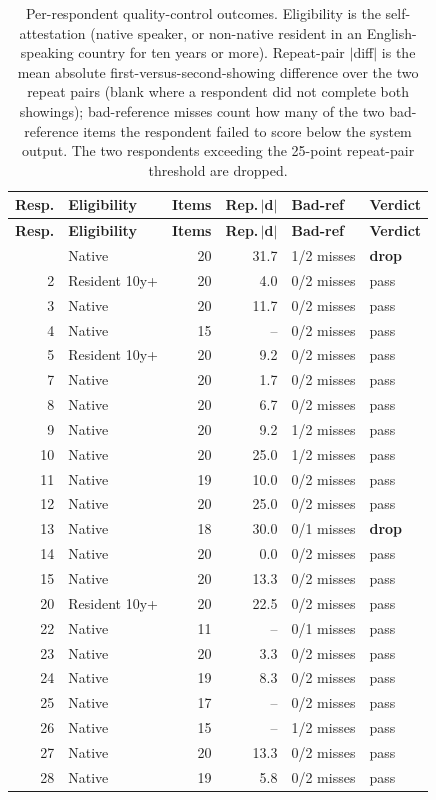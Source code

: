 \begin{longtable}{rlrrll}
\caption{Per-respondent quality-control outcomes. Eligibility is the self-attestation (native speaker, or non-native resident in an English-speaking country for ten years or more). Repeat-pair $|$diff$|$ is the mean absolute first-versus-second-showing difference over the two repeat pairs (blank where a respondent did not complete both showings); bad-reference misses count how many of the two bad-reference items the respondent failed to score below the system output. The two respondents exceeding the 25-point repeat-pair threshold are dropped.}\label{tab:appendix-qc}\\
\hline
\textbf{Resp.} & \textbf{Eligibility} & \textbf{Items} & \textbf{Rep.\,$|$d$|$} & \textbf{Bad-ref} & \textbf{Verdict} \\
\hline
\endfirsthead
\hline
\textbf{Resp.} & \textbf{Eligibility} & \textbf{Items} & \textbf{Rep.\,$|$d$|$} & \textbf{Bad-ref} & \textbf{Verdict} \\
\hline
\endhead
\hline
\endfoot
1 & Native & 20 & 31.7 & 1/2 misses & \textbf{drop} \\
2 & Resident 10y+ & 20 & 4.0 & 0/2 misses & pass \\
3 & Native & 20 & 11.7 & 0/2 misses & pass \\
4 & Native & 15 & -- & 0/2 misses & pass \\
5 & Resident 10y+ & 20 & 9.2 & 0/2 misses & pass \\
7 & Native & 20 & 1.7 & 0/2 misses & pass \\
8 & Native & 20 & 6.7 & 0/2 misses & pass \\
9 & Native & 20 & 9.2 & 1/2 misses & pass \\
10 & Native & 20 & 25.0 & 1/2 misses & pass \\
11 & Native & 19 & 10.0 & 0/2 misses & pass \\
12 & Native & 20 & 25.0 & 0/2 misses & pass \\
13 & Native & 18 & 30.0 & 0/1 misses & \textbf{drop} \\
14 & Native & 20 & 0.0 & 0/2 misses & pass \\
15 & Native & 20 & 13.3 & 0/2 misses & pass \\
20 & Resident 10y+ & 20 & 22.5 & 0/2 misses & pass \\
22 & Native & 11 & -- & 0/1 misses & pass \\
23 & Native & 20 & 3.3 & 0/2 misses & pass \\
24 & Native & 19 & 8.3 & 0/2 misses & pass \\
25 & Native & 17 & -- & 0/2 misses & pass \\
26 & Native & 15 & -- & 1/2 misses & pass \\
27 & Native & 20 & 13.3 & 0/2 misses & pass \\
28 & Native & 19 & 5.8 & 0/2 misses & pass \\
\end{longtable}
